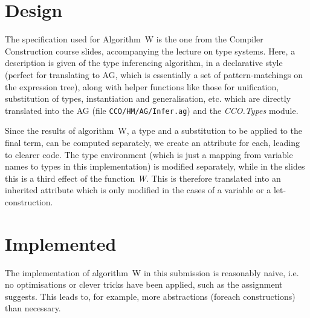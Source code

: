 \documentclass[a4paper]{article}
\begin{document}
\section{Design}

The specification used for Algorithm~W is the one from the Compiler Construction
course slides, accompanying the lecture on type systems. Here, a description is
given of the type inferencing algorithm, in a declarative style (perfect for
translating to AG, which is essentially a set of pattern-matchings on the
expression tree), along with helper functions like those for unification,
substitution of types, instantiation and generalisation, etc. which are directly translated into the AG (file
\texttt{CCO/HM/AG/Infer.ag}) and the \emph{CCO.Types} module.

Since the results of algorithm~W, a type and a substitution to be applied to the
final term, can be computed separately, we create an attribute for each, leading
to clearer code. The type environment (which is just a mapping from variable
names to types in this implementation) is modified separately, while in the
slides this is a third effect of the function \emph{W}. This is therefore
translated into an inherited attribute which is only modified in the cases of a
variable or a let-construction. 


\section{Implemented}

The implementation of algorithm~W in this submission is reasonably naive, i.e.
no optimisations or clever tricks have been applied, such as the assignment
suggests. This leads to, for example, more abstractions (foreach constructions)
than necessary. 
\end{document}
